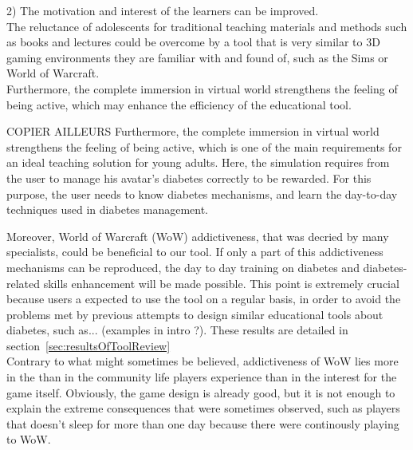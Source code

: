 \documentclass[12pt,MSc]{muthesis}
\begin{document}

2) The motivation and interest of the learners can be improved.\\
The reluctance of adolescents for traditional teaching materials and methods such as books and lectures could be overcome by a tool that is very similar to 3D gaming environments they are familiar with and found of, such as the Sims or World of Warcraft.\\
Furthermore, the complete immersion in virtual world strengthens the feeling of being active, which may enhance the efficiency of the educational tool. 

\iffalse COPIER AILLEURS Furthermore, the complete immersion in virtual world strengthens the feeling of being active, which is one of the main requirements for an ideal teaching solution for young adults. Here, the simulation requires from the user to manage his avatar's diabetes correctly to be rewarded. For this purpose, the user needs to know diabetes mechanisms, and learn the day-to-day techniques used in diabetes management. 

Moreover, World of Warcraft (WoW) addictiveness, that was decried by many specialists, could be beneficial to our tool. If only a part of this addictiveness mechanisms can be reproduced, the day to day training on diabetes and diabetes-related skills enhancement will be made possible. This point is extremely crucial because users a expected to use the tool on a regular basis, in order to avoid the problems met by previous attempts to design similar educational tools about diabetes, such as... (examples in intro ?). These results are detailed in section~\ref{sec:resultsOfToolReview}\\

Contrary to what might sometimes be believed, addictiveness of WoW lies more in the than in the community life players experience than in the interest for the game itself. Obviously, the game design is already good, but it is not enough to explain the extreme consequences that were sometimes observed, such as players that doesn't sleep for more than one day because there were continously playing to WoW. 
\end{document}
